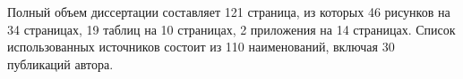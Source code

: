 Полный объем диссертации составляет 121 страница, из которых 46 рисунков на 34 страницах, 19 таблиц на 10 страницах, 2 приложения на 14 страницах. Список использованных источников состоит из 110 наименований, включая 30 публикаций автора.




%
